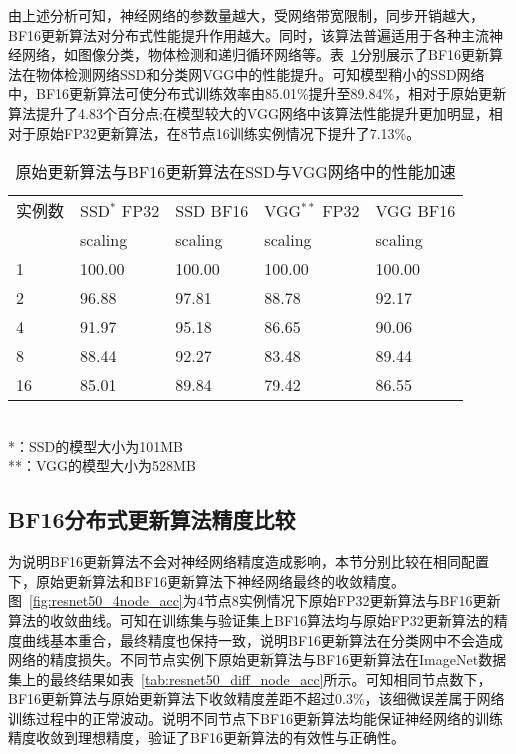由上述分析可知，神经网络的参数量越大，受网络带宽限制，同步开销越大，BF16更新算法对分布式性能提升作用越大。同时，该算法普遍适用于各种主流神经网络，如图像分类，物体检测和递归循环网络等。表~\ref{tab:ssd_vgg_scaling}分别展示了BF16更新算法在物体检测网络SSD和分类网VGG中的性能提升。可知模型稍小的SSD网络中，BF16更新算法可使分布式训练效率由85.01\%提升至89.84\%，相对于原始更新算法提升了4.83个百分点;在模型较大的VGG网络中该算法性能提升更加明显，相对于原始FP32更新算法，在8节点16训练实例情况下提升了7.13\%。
\begin{table}[htbp]
  \centering
  \caption{原始更新算法与BF16更新算法在SSD与VGG网络中的性能加速}
  \label{tab:ssd_vgg_scaling}
  \begin{minipage}[t]{0.8\textwidth} 
    \begin{tabularx}{\linewidth}{|l|X|X|X|X|}
      \hline
      实例数 & SSD$^{*}$ FP32 & SSD BF16 & VGG$^{**}$ FP32 & VGG BF16 \\
       & scaling & scaling & scaling & scaling\\
      \hline
1 & 100.00 & 100.00 & 100.00 & 100.00 \\
2 & 96.88 & 97.81 & 88.78 & 92.17 \\
4 & 91.97 & 95.18 & 86.65 & 90.06 \\
8 & 88.44 & 92.27 & 83.48 & 89.44 \\
16 & 85.01 & 89.84 & 79.42 & 86.55 \\
      \hline
    \end{tabularx}\\[2pt]
    \footnotesize
    *：SSD的模型大小为101MB\\
    **：VGG的模型大小为528MB
  \end{minipage}
\end{table}

\subsection{BF16分布式更新算法精度比较}
为说明BF16更新算法不会对神经网络精度造成影响，本节分别比较在相同配置下，原始更新算法和BF16更新算法下神经网络最终的收敛精度。图~\ref{fig:resnet50_4node_acc}为4节点8实例情况下原始FP32更新算法与BF16更新算法的收敛曲线。可知在训练集与验证集上BF16算法均与原始FP32更新算法的精度曲线基本重合，最终精度也保持一致，说明BF16更新算法在分类网中不会造成网络的精度损失。不同节点实例下原始更新算法与BF16更新算法在ImageNet数据集上的最终结果如表~\ref{tab:resnet50_diff_node_acc}所示。可知相同节点数下，BF16更新算法与原始更新算法下收敛精度差距不超过0.3\%，该细微误差属于网络训练过程中的正常波动。说明不同节点下BF16更新算法均能保证神经网络的训练精度收敛到理想精度，验证了BF16更新算法的有效性与正确性。 


